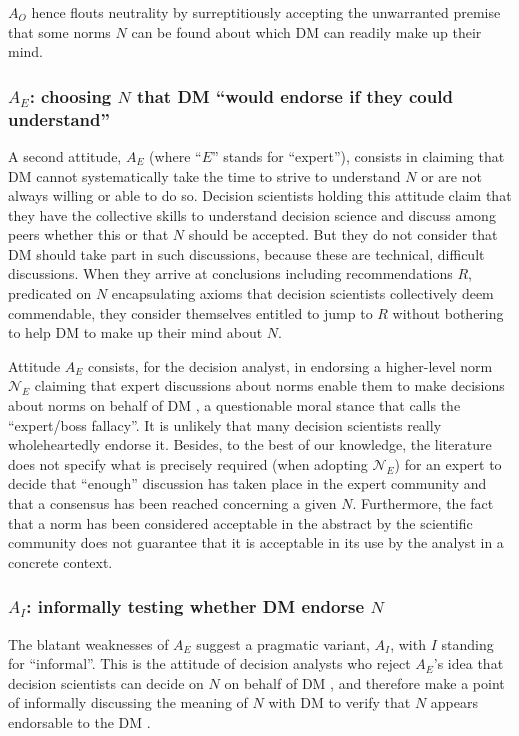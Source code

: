 \documentclass[preprint, french, english, 11pt, authoryear]{elsarticle}%
\newcommand{\protectforpdf}[1]{\texorpdfstring{\ensuremath{#1}}{#1}}
\begin{document}
$A_O$ hence flouts neutrality by surreptitiously accepting the unwarranted premise that 
some norms $N$ can be found about which DM%
 can readily make up their mind.

\subsubsection{\texorpdfstring{$A_E$}{AE}: choosing \protectforpdf{N} that DM%
 “would endorse if they could understand”}

A second attitude, $A_E$ (where ``$E$'' stands for “expert”), consists in claiming that DM%
 cannot systematically take the time to strive to understand $N$ or are not always willing or able to do so. 
Decision scientists holding this attitude claim that they have the collective skills to understand decision science and discuss among peers whether this or that $N$ should be accepted. 
But they do not consider that DM%
 should take part in such discussions, because these are technical, difficult discussions. 
When they arrive at conclusions including recommendations $R$, predicated on $N$ encapsulating axioms that decision scientists collectively deem commendable, they consider themselves entitled to jump to $R$ without bothering to help DM%
 to make up their mind about $N$. 

Attitude $A_E$ consists, for the decision analyst, in endorsing a higher-level norm $\mathscr{N}_E$ claiming that expert discussions about norms enable them to make decisions about norms on behalf of DM%
, a questionable moral stance that \citet{estlund_democratic_2009} calls the ``expert/boss fallacy''. 
It is unlikely that many decision scientists really wholeheartedly endorse it. 
Besides, to the best of our knowledge, the literature does not specify what is precisely required (when adopting  $\mathscr{N}_E$) for an expert to decide that “enough” discussion has taken place in the expert community and that a consensus has been reached concerning a given $N$. 
Furthermore, the fact that a norm has been considered acceptable in the abstract by the scientific community does not guarantee that it is acceptable in its use by the analyst in a concrete context.

\subsubsection{\texorpdfstring{$A_I$}{AI}: informally testing whether DM%
endorse \protectforpdf{N}}
The blatant weaknesses of $A_E$ suggest a pragmatic variant, $A_I$, with $I$ standing for “informal”. 
This is the attitude of decision analysts who reject $A_E$'s idea that decision scientists can decide on $N$ on behalf of DM%
, and therefore make a point of informally discussing the meaning of $N$ with DM%
 to verify that %
$N$ appears endorsable to the DM%
.%
\end{document}
